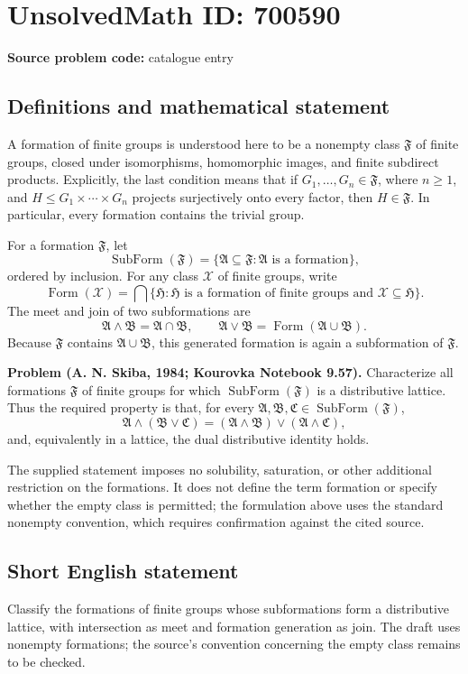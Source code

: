 \documentclass[11pt]{article}
\begin{document}
\section*{UnsolvedMath ID: 700590}
\textbf{Source problem code:} catalogue entry
\subsection{Definitions and mathematical statement}
A formation of finite groups is understood here to be a nonempty class \(\mathfrak F\) of finite groups, closed under isomorphisms, homomorphic images, and finite subdirect products. Explicitly, the last condition means that if \(G_1,\ldots,G_n\in\mathfrak F\), where \(n\geq 1\), and \(H\leq G_1\times\cdots\times G_n\) projects surjectively onto every factor, then \(H\in\mathfrak F\). In particular, every formation contains the trivial group.

For a formation \(\mathfrak F\), let
\[
\operatorname{SubForm}(\mathfrak F)=\{\mathfrak A\subseteq\mathfrak F:\mathfrak A\text{ is a formation}\},
\]
ordered by inclusion. For any class \(\mathcal X\) of finite groups, write
\[
\operatorname{Form}(\mathcal X)=\bigcap\{\mathfrak H:\mathfrak H\text{ is a formation of finite groups and }\mathcal X\subseteq\mathfrak H\}.
\]
The meet and join of two subformations are
\[
\mathfrak A\wedge\mathfrak B=\mathfrak A\cap\mathfrak B,
\qquad
\mathfrak A\vee\mathfrak B=\operatorname{Form}(\mathfrak A\cup\mathfrak B).
\]
Because \(\mathfrak F\) contains \(\mathfrak A\cup\mathfrak B\), this generated formation is again a subformation of \(\mathfrak F\).

\textbf{Problem (A. N. Skiba, 1984; Kourovka Notebook 9.57).} Characterize all formations \(\mathfrak F\) of finite groups for which \(\operatorname{SubForm}(\mathfrak F)\) is a distributive lattice. Thus the required property is that, for every \(\mathfrak A,\mathfrak B,\mathfrak C\in\operatorname{SubForm}(\mathfrak F)\),
\[
\mathfrak A\wedge(\mathfrak B\vee\mathfrak C)
=(\mathfrak A\wedge\mathfrak B)\vee(\mathfrak A\wedge\mathfrak C),
\]
and, equivalently in a lattice, the dual distributive identity holds.

The supplied statement imposes no solubility, saturation, or other additional restriction on the formations. It does not define the term formation or specify whether the empty class is permitted; the formulation above uses the standard nonempty convention, which requires confirmation against the cited source.
\subsection{Short English statement}
Classify the formations of finite groups whose subformations form a distributive lattice, with intersection as meet and formation generation as join. The draft uses nonempty formations; the source's convention concerning the empty class remains to be checked.
\end{document}
